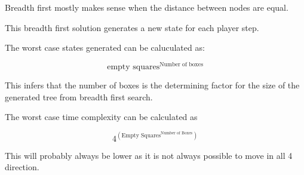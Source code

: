 \documentclass[../../main.tex]{subfiles}
\begin{document}
Breadth first mostly makes sense when the distance between nodes are equal.

This breadth first solution generates a new state for each player step.

The worst case states generated can be caluculated as:

\begin{equation}
	\textrm{empty squares}^{ \textrm{Number of boxes}}
\end{equation}

This infers that the number of boxes is the determining factor for the size
of the generated tree from breadth first search.

The worst case time complexity can be calculated as

\begin{equation}
	4^{  \left(  \textrm{Empty Squares} ^{ \textrm{Number of Boxes}}  \right)   }
\end{equation}

This will probably always be lower as it is not always possible to move in all 4 direction.


	
\end{document}
